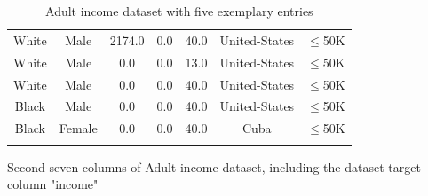 \begin{table}[h]
\begin{subtable}{\textwidth}
{\begin{tabular}{|c|c|c|c|c|c|c|}
                White         & Male         & 2174.0                & 0.0                   & 40.0                    & United-States           & $\leq$50K       \\
                White         & Male         & 0.0                   & 0.0                   & 13.0                    & United-States           & $\leq$50K       \\
                White         & Male         & 0.0                   & 0.0                   & 40.0                    & United-States           & $\leq$50K       \\
                Black         & Male         & 0.0                   & 0.0                   & 40.0                    & United-States           & $\leq$50K       \\
                Black         & Female       & 0.0                   & 0.0                   & 40.0                    & Cuba                    & $\leq$50K       \\
                \bottomrule
				\multicolumn{7}{c}{}\\[-0.6em]
            \end{tabular}
        }
        \caption{Second seven columns of Adult income dataset, including the dataset target column "income"}
        \label{subtab:adult2}
    \end{subtable}
	\caption[Example Adult Dataset]{Adult income dataset with five exemplary entries}
	\label{tab:adult}
\end{table}

